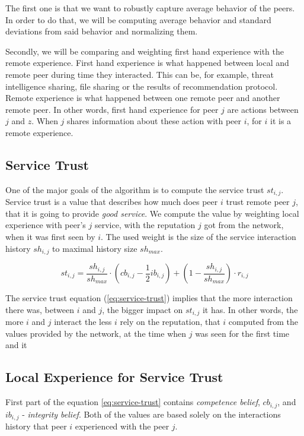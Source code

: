 The first one is that we want to robustly capture average behavior of the peers. In order to do that, we will be computing average behavior and standard deviations from said behavior and normalizing them.

Secondly, we will be comparing and weighting first hand experience with the remote experience. 
First hand experience is what happened between local and remote peer during time they interacted. This can be, for example, threat intelligence sharing, file sharing or the results of recommendation protocol.
Remote experience is what happened between one remote peer and another remote peer. In other words, first hand experience for peer $j$ are actions between $j$ and $z$. When $j$ shares information about these action with peer $i$, for $i$ it is a remote experience.

\subsection{Service Trust}
\label{subsec:service-trust}
One of the major goals of the algorithm is to compute the service trust $st_{i,j}$. 
Service trust is a value that describes how much does peer $i$ trust remote peer $j$, that it is going to provide \textit{good service}.
We compute the value by weighting local experience with peer's $j$ service, with the reputation $j$ got from the network, when it was first seen by $i$.
The used weight is the size of the service interaction history $sh_{i,j}$ to maximal history size $sh_{max}$.

\begin{equation}
\label{eq:service-trust}
    st_{i,j}=\frac{sh_{i,j}}{sh_{max}} \cdot \left(cb_{i,j} - \frac{1}{2} ib_{i,j} \right) +\left(1-\frac{sh_{i,j}}{sh_{max}}\right) \cdot r_{i,j}
\end{equation}

The service trust equation (\ref{eq:service-trust}) implies that the more interaction there was, between $i$ and $j$, the bigger impact on $st_{i,j}$ it has. 
In other words, the more $i$ and $j$ interact the less $i$ rely on the reputation, that $i$ computed from the values provided by the network, at the time when $j$ was seen for the first time and it 

\subsection{Local Experience for Service Trust}
First part of the equation \ref{eq:service-trust} contains \textit{competence belief}, $cb_{i,j}$, and $ib_{i,j}$ - \textit{integrity belief}.
Both of the values are based solely on the interactions history that peer $i$ experienced with the peer $j$.

